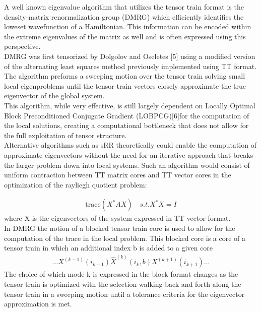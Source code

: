 \documentclass[%
 aip,12pt
 amsmath,amssymb,
 reprint,%
]{revtex4-1}
\begin{document}
A well known eigenvalue algorithm that utilizes the tensor train format is the  density-matrix renormalization group (DMRG) which efficiently identifies the loweset wavefunction of a Hamiltonian. This information can be encoded within the extreme eigenvalues of the matrix as well and is often expressed using this perspective. \\
DMRG was first tensorized by Dolgolov and Oseletes [5] using a modified version of the alternating least squares method previously implemented using TT format. The algorithm preforms a sweeping motion over the tensor train solving small local eigenproblems until the tensor train vectors closely approximate the true eigenvector of the global system.
\\
This algorithm, while very effective,  is still largely dependent on Locally Optimal Block Preconditioned Conjugate Gradient (LOBPCG)[6]for the computation of the local solutions, creating a computational bottleneck that does not allow for the full exploitation of tensor structure.\\
Alternative algorithms such as sRR theoretically could enable the computation of approximate eigenvectors without the need for an iterative approach that breaks the larger problem down into local systems. Such an algorithm would consist of uniform contraction between TT matrix cores and TT vector cores in the optimization of the rayliegh quotient problem:

\begin{eqnarray}
  \text{trace}(X^*AX)\quad s.t. X^*X=I
  \label{eq:five}
\end{eqnarray}
 where X is the eigenvectors of the system expressed in TT vector format. \\
 In DMRG  the notion of a blocked tensor train core is used to allow for the computation of the trace in the local problem. This blocked core is a core of a tensor train in which an additional index b is added to a given core
 \begin{eqnarray}
 \dots X^{(k-1)}\left(i_{k-1}\right) \widehat{X}^{(k)}\left(i_{k}, b\right) X^{(k+1)}\left(i_{k+1}\right) \ldots
\end{eqnarray}
The choice of which mode k is expressed in the block format changes as the tensor train is optimized with the selection walking back and forth along the tensor train in a sweeping motion until a tolerance criteria for the eigenvector approximation is met.
\end{document}
